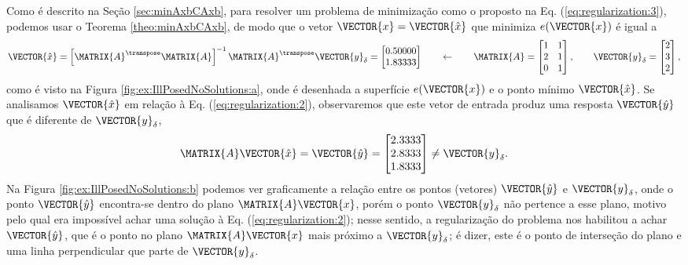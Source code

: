\begin{SolutionT}
Como é descrito na Seção \ref{sec:minAxbCAxb}, para resolver um problema de minimização como o proposto na Eq. (\ref{eq:regularization:3}),
podemos usar o Teorema \ref{theo:minAxbCAxb}, de modo que o vetor $\VECTOR{x}=\VECTOR{\hat{x}}$ que minimiza $e(\VECTOR{x})$
é igual a
\begin{equation}\label{eq:regularization:3b}
\VECTOR{\hat{x}} =
\left[ \MATRIX{A}^{\transpose} \MATRIX{A} \right]^{-1}\MATRIX{A}^{\transpose}\VECTOR{y}_{\delta}
=
\begin{bmatrix}
0.50000 \\
1.83333
\end{bmatrix}
\qquad \leftarrow \qquad
\MATRIX{A}=
\begin{bmatrix}
1 & 1\\
2 & 1\\
0 & 1
\end{bmatrix},
\qquad
\VECTOR{y}_{\delta}=
\begin{bmatrix}
2\\
3\\
2
\end{bmatrix},
\end{equation}
como é visto na Figura \ref{fig:ex:IllPosedNoSolutions:a}, 
onde é desenhada a superfície $e(\VECTOR{x})$ e o ponto mínimo $\VECTOR{\hat{x}}$.
Se analisamos $\VECTOR{\hat{x}}$ em relação à Eq. (\ref{eq:regularization:2}),
observaremos que este vetor de entrada produz uma resposta $\VECTOR{\hat{y}}$ que é diferente de $\VECTOR{y}_{\delta}$,
\begin{equation}
\MATRIX{A}\VECTOR{\hat{x}}= \VECTOR{\hat{y}} =
\begin{bmatrix}
2.3333\\
2.8333\\
1.8333
\end{bmatrix}
\neq \VECTOR{y}_{\delta}.
\end{equation}
Na Figura \ref{fig:ex:IllPosedNoSolutions:b} podemos ver graficamente a relação entre os pontos (vetores)
$\VECTOR{\hat{y}}$ e $\VECTOR{y}_{\delta}$,
onde o ponto $\VECTOR{\hat{y}}$ encontra-se dentro do plano $\MATRIX{A}\VECTOR{x}$,
porém o ponto $\VECTOR{y}_{\delta}$ não pertence a esse plano, 
motivo pelo qual era impossível achar uma solução à Eq. (\ref{eq:regularization:2});
nesse sentido, a regularização do problema nos habilitou a achar $\VECTOR{\hat{y}}$,
que é o ponto no plano  $\MATRIX{A}\VECTOR{x}$ mais próximo a $\VECTOR{y}_{\delta}$;
é dizer, este é o ponto de interseção do plano e uma linha perpendicular que parte de $\VECTOR{y}_{\delta}$.
\end{SolutionT}

